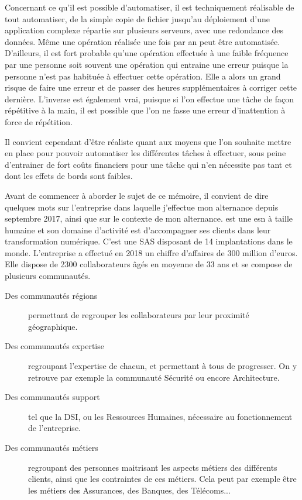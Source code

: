 Concernant ce qu'il est possible d'automatiser, il est techniquement réalisable de tout automatiser, de la simple copie de fichier jusqu'au déploiement d'une application complexe répartie sur plusieurs serveurs, avec une redondance des données. Même une opération réalisée une fois par an peut être automatisée. D'ailleurs, il est fort probable qu'une opération effectuée à une faible fréquence par une personne soit souvent une opération qui entraine une erreur puisque la personne n'est pas habituée à effectuer cette opération. Elle a alors un grand risque de faire une erreur et de passer des heures supplémentaires à corriger cette dernière. L'inverse est également vrai, puisque si l'on effectue une tâche de façon répétitive à la main, il est possible que l'on ne fasse une erreur d'inattention à force de répétition. 

Il convient cependant d'être réaliste quant aux moyens que l'on souhaite mettre en place pour pouvoir automatiser les différentes tâches à effectuer, sous peine d'entrainer de fort coûts financiers pour une tâche qui n'en nécessite pas tant et dont les effets de bords sont faibles.

Avant de commencer à aborder le sujet de ce mémoire, il convient de dire quelques mots sur l'entreprise dans laquelle j'effectue mon alternance depuis septembre 2017, \onepoint ainsi que sur le contexte de mon alternance. \xmakefirstuc{\onepoint{}} est une \gls{esn} à taille humaine et son domaine d'activité est d'accompagner ses clients dans leur transformation numérique. C'est une \gls{SAS} disposant de 14 implantations dans le monde. L'entreprise a effectué en 2018 un chiffre d'affaires de 300 million d'euros. Elle dispose de 2300 collaborateurs âgés en moyenne de 33 ans et se compose de plusieurs communautés.

\begin{description}
	\item [Des communautés régions] permettant de regrouper les collaborateurs par leur proximité géographique.
	\item [Des communautés expertise] regroupant l'expertise de chacun, et permettant à tous de progresser. On y retrouve par exemple la communauté Sécurité ou encore Architecture.
	\item [Des communautés support] tel que la \gls{DSI}, ou les Ressources Humaines, nécessaire au fonctionnement de l'entreprise.
	\item [Des communautés métiers] regroupant des personnes maitrisant les aspects métiers des différents clients, ainsi que les contraintes de ces métiers. Cela peut par exemple être les métiers des Assurances, des Banques, des Télécoms... 
\end{description}

